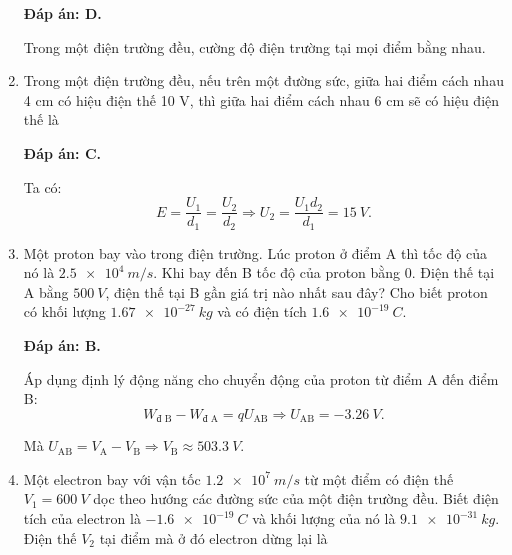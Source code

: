 \begin{enumerate}[label=\bfseries Câu \arabic*:]
{	}
	\loigiai
	{	\textbf{Đáp án: D.}
		
		Trong một điện trường đều, cường độ điện trường tại mọi điểm bằng nhau.
	}
	\item {}
	
	\cauhoi
	{Trong một điện trường đều, nếu trên một đường sức, giữa hai điểm cách nhau 4 cm có hiệu điện thế 10 V, thì giữa hai điểm cách nhau 6 cm sẽ có hiệu điện thế là
		
	}
	\loigiai
	{	\textbf{Đáp án: C.}
		
		Ta có:
		$$E=\dfrac{U_1}{d_1} = \dfrac{U_2}{d_2} \Rightarrow U_2 = \dfrac{U_1 d_2}{d_1} = \SI{15}{V}.$$
	}
	\item {}
	
	\cauhoi
	{Một proton bay vào trong điện trường. Lúc proton ở điểm A thì tốc độ của nó là $\SI{2.5e4}{m/s}$. Khi bay đến B tốc độ của proton bằng 0. Điện thế tại A bằng $\SI{500}{V}$, điện thế tại B gần giá trị nào nhất sau đây? Cho biết proton có khối lượng $\SI{1.67e-27}{kg}$ và có điện tích $\SI{1.6e-19}{C}$.
		
	}
	\loigiai
	{	\textbf{Đáp án: B.}
		
		Áp dụng định lý động năng cho chuyển động của proton từ điểm A đến điểm B:
		$$W_\text{đ B} - W_\text{đ A} = qU_\text{AB} \Rightarrow U_\text{AB} = \SI{-3.26}{V}.$$
		
		Mà $U_\text{AB} = V_\text{A} - V_\text{B} \Rightarrow V_\text{B} \approx \SI{503.3}{V}$.
	}
	\item {}
	
	\cauhoi
	{Một electron bay với vận tốc $\SI{1.2e7}{m/s}$ từ một điểm có điện thế $V_1=\SI{600}{V}$ dọc theo hướng các đường sức của một điện trường đều. Biết điện tích của electron là $\SI{-1.6e-19}{C}$ và khối lượng của nó là $\SI{9.1e-31}{kg}$. Điện thế $V_2$ tại điểm mà ở đó electron dừng lại là
		
}
\end{enumerate}
